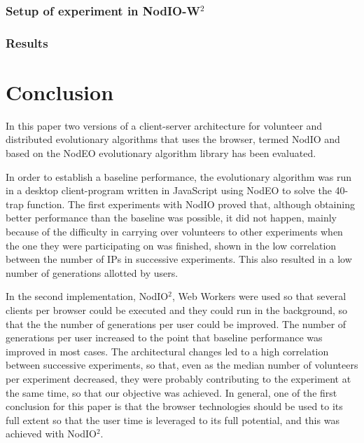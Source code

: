 \documentclass[journal,onecolumn]{IEEEtran}
\begin{document}
\subsubsection{Setup of experiment in NodIO-W$^2$ }

\subsubsection{Results}

\section{Conclusion}
\label{sec:conclusion}

In this paper two versions of a client-server architecture for volunteer and distributed
evolutionary algorithms that uses the browser, termed {\sf NodIO} and
based on the {\sf NodEO} evolutionary algorithm library has been evaluated.

In order to establish a baseline performance, the evolutionary
algorithm was run in a desktop client-program written in JavaScript
using NodEO to solve the 40-trap function. The first experiments with
{\sf NodIO} proved that, although obtaining better performance than the
baseline was possible, it did not happen, mainly because of the
difficulty in carrying over volunteers to other experiments when the
one they were participating on was finished, shown in the low
correlation between the number of IPs in successive experiments. This
also resulted in a low number of generations allotted by users. 

In the second implementation, {\sf NodIO$^2$}, Web Workers
were used so that several clients per browser could be executed and
they could run in the background, so that the the number of
generations per user could be improved. The number of generations per
user increased to the point that baseline performance was improved in
most cases. The architectural changes led to a high correlation
between successive experiments, so that, even as the median number of
volunteers per experiment decreased, they were probably contributing
to the experiment at the same time, so that our objective was
achieved. In general, one of the first conclusion for this paper is
that the browser technologies should be used to its full extent so
that the user time is leveraged to its full potential, and this was
achieved with {\sf NodIO$^2$}.
\end{document}
